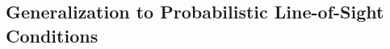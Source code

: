 \subsection{Generalization to Probabilistic Line-of-Sight Conditions}\label{Probabilistic-LOS-NLOS}

